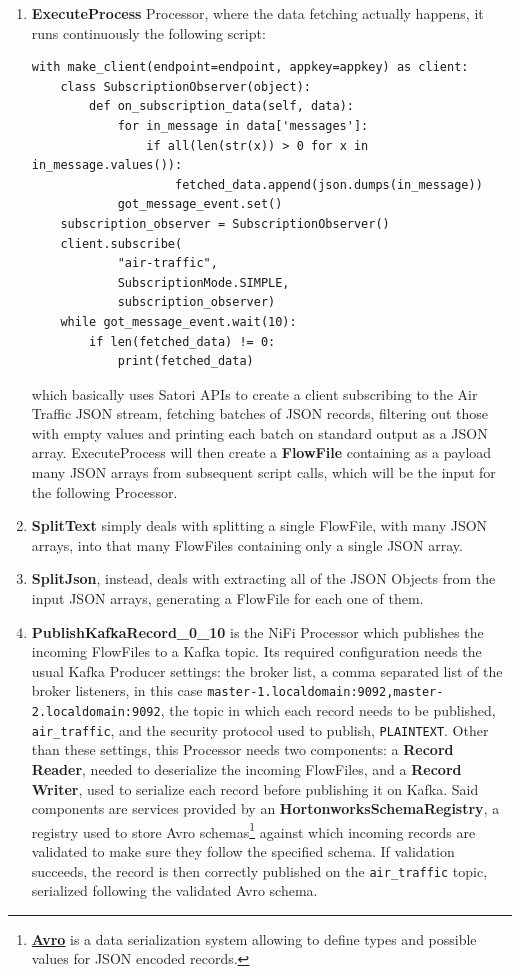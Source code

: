 \begin{enumerate}
    \item \textbf{ExecuteProcess} Processor, where the data fetching actually happens, it runs continuously the following script:
    \\
    \begin{code}
        \begin{verbatim}
with make_client(endpoint=endpoint, appkey=appkey) as client:
    class SubscriptionObserver(object):
        def on_subscription_data(self, data):
            for in_message in data['messages']:
                if all(len(str(x)) > 0 for x in in_message.values()):
                    fetched_data.append(json.dumps(in_message))
            got_message_event.set()
    subscription_observer = SubscriptionObserver()
    client.subscribe(
            "air-traffic",
            SubscriptionMode.SIMPLE,
            subscription_observer)
    while got_message_event.wait(10):
        if len(fetched_data) != 0:
            print(fetched_data)
        \end{verbatim}
    \end{code}
which basically uses Satori APIs to create a client subscribing to the Air Traffic JSON stream, fetching batches of JSON records, filtering out those with empty values and printing each batch on standard output as a JSON array. ExecuteProcess will then create a \textbf{FlowFile} containing as a payload many JSON arrays from subsequent script calls, which will be the input for the following Processor.

\item \textbf{SplitText} simply deals with splitting a single FlowFile, with many JSON arrays, into that many FlowFiles containing only a single JSON array.
\item \textbf{SplitJson}, instead, deals with extracting all of the JSON Objects from the input JSON arrays, generating a FlowFile for each one of them.
\item \textbf{PublishKafkaRecord\_0\_10} is the NiFi Processor which publishes the incoming FlowFiles to a Kafka topic. Its required configuration needs the usual Kafka Producer settings: the broker list, a comma separated list of the broker listeners, in this case \texttt{master-1.localdomain:9092,master-2.localdomain:9092}, the topic in which each record needs to be published, \texttt{air\_traffic}, and the security protocol used to publish, \texttt{PLAINTEXT}. Other than these settings, this Processor needs two components: a \textbf{Record Reader}, needed to deserialize the incoming FlowFiles, and a \textbf{Record Writer}, used to serialize each record before publishing it on Kafka. Said components are services provided by an \textbf{HortonworksSchemaRegistry}, a registry used to store Avro schemas\footnote{\textbf{\href{https://avro.apache.org/}{Avro}} is a data serialization system allowing to define types and possible values for JSON encoded records.} against which incoming records are validated to make sure they follow the specified schema. If validation succeeds, the record is then correctly published on the \texttt{air\_traffic} topic, serialized following the validated Avro schema.
\end{enumerate}

